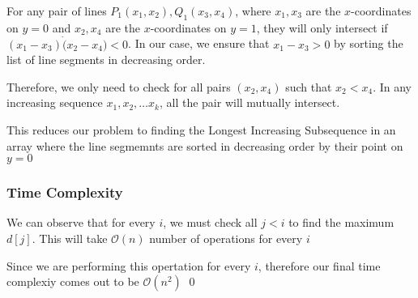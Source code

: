 \documentclass[12pt]{article}
\begin{document}
For any pair of lines $P_1(x_1, x_2), Q_1(x_3, x_4)$, where $x_1, x_3$ are the $x$-coordinates on $y = 0$ and $x_2, x_4$ are the $x$-coordinates on $y = 1$, they will only intersect if $(x_1 - x_3) \dot (x_2 - x_4) < 0$. In our case, we ensure that $x_1 - x_3 > 0$ by sorting the list of line segments in decreasing order. 

Therefore, we only need to check for all pairs $(x_2, x_4)$ such that $x_2 < x_4$. In any increasing sequence $x_1, x_2, \dots x_k$, all the pair will mutually intersect. 

This reduces our problem to finding the Longest Increasing Subsequence in an array where the line segmemnts are sorted in decreasing order by their point on $y = 0$ 


\subsubsection{Time Complexity}

We can observe that for every $i$, we must check all $j < i$ to find the maximum $d[j]$. This will take $\mathcal{O}(n)$ number of operations for every $i$

Since we are performing this opertation for every $i$, therefore our final time complexiy comes out to be $\mathcal{O}(n^2)$
\qed












\pagebreak






\end{document}
